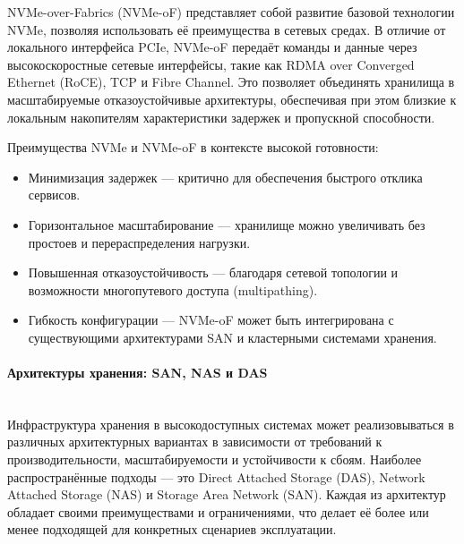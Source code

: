 NVMe-over-Fabrics (NVMe-oF) представляет собой развитие базовой технологии NVMe, позволяя использовать её преимущества в сетевых средах. В отличие от локального интерфейса PCIe, NVMe-oF передаёт команды и данные через высокоскоростные сетевые интерфейсы, такие как RDMA over Converged Ethernet (RoCE), TCP и Fibre Channel. Это позволяет объединять хранилища в масштабируемые отказоустойчивые архитектуры, обеспечивая при этом близкие к локальным накопителям характеристики задержек и пропускной способности. \autocite{Nvmeof}

Преимущества NVMe и NVMe-oF в контексте высокой готовности:
\begin{itemize}
    \item Минимизация задержек — критично для обеспечения быстрого отклика сервисов.
    \item Горизонтальное масштабирование — хранилище можно увеличивать без простоев и перераспределения нагрузки.
    \item Повышенная отказоустойчивость — благодаря сетевой топологии и возможности многопутевого доступа (multipathing).
    \item Гибкость конфигурации — NVMe-oF может быть интегрирована с существующими архитектурами SAN и кластерными системами хранения.
\end{itemize}

\paragraph{Архитектуры хранения: SAN, NAS и DAS} ~\\
Инфраструктура хранения в высокодоступных системах может реализовываться в различных архитектурных вариантах в зависимости от требований к производительности, масштабируемости и устойчивости к сбоям. Наиболее распространённые подходы — это Direct Attached Storage (DAS), Network Attached Storage (NAS) и Storage Area Network (SAN). Каждая из архитектур обладает своими преимуществами и ограничениями, что делает её более или менее подходящей для конкретных сценариев эксплуатации. \autocites{SnedakerS}{WallaceWebber}

